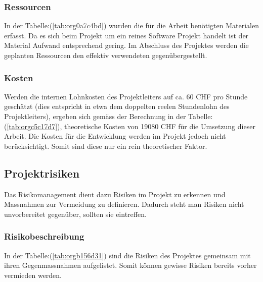 \subsubsection{Ressourcen}
\label{sec:orgf32159d}

In der Tabelle:(\ref{tab:org0a7c4bd}) wurden die für die Arbeit benötigten Materialen
erfasst. Da es sich beim Projekt um ein reines Software Projekt handelt ist der
Material Aufwand entsprechend gering. Im Abschluss des Projektes werden die
geplanten Ressourcen den effektiv verwendeten gegenübergestellt.

\subsubsection{Kosten}
\label{sec:org7c0906b}

Werden die internen Lohnkosten des Projektleiters auf ca. 60 CHF pro Stunde
geschätzt (dies entspricht in etwa dem doppelten reelen Stundenlohn des
Projektleiters), ergeben sich gemäss der Berechnung in der
Tabelle:(\ref{tab:orgc5c17d7}), theoretische Kosten von 19080 CHF für die Umsetzung
dieser Arbeit. Die Kosten für die Entwicklung werden im Projekt jedoch nicht
berücksichtigt. Somit sind diese nur ein rein theoretischer Faktor.

\subsection{Projektrisiken}
\label{sec:orge68685e}

Das Risikomanagement dient dazu Risiken im Projekt zu erkennen und Massnahmen
zur Vermeidung zu definieren. Dadurch steht man Risiken nicht
unvorbereitet gegenüber, sollten sie eintreffen.

\subsubsection{Risikobeschreibung}
\label{sec:org5fac90a}

In der Tabelle:(\ref{tab:orgb156d31}) sind die Risiken des Projektes
gemeinsam mit ihren Gegenmassnahmen aufgelistet. Somit können gewisse Risiken
bereits vorher vermieden werden.

